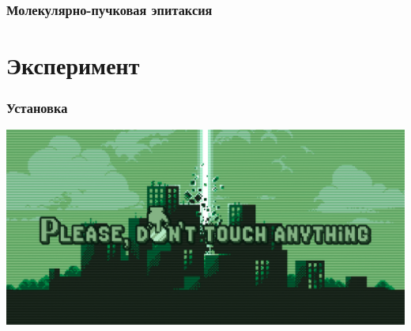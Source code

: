 \documentclass[10pt,pdf,hyperref={unicode}, dvipsnames]{beamer}
\begin{document}
\begin{frame}[t]
	\frametitle{Молекулярно-пучковая эпитаксия}
\end{frame}


\section{Эксперимент}
\begin{frame}[t]
	\frametitle{Установка}
	\includegraphics[width = \linewidth]{imgs/pdt.png}
\end{frame}
\end{document}

